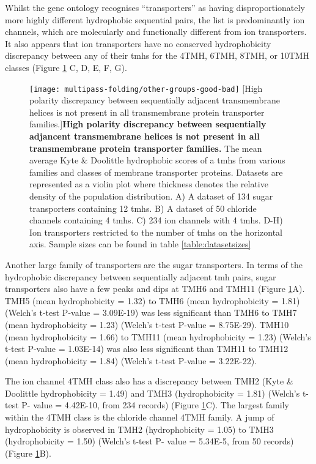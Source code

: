 Whilst the gene ontology recognises ``transporters'' as having disproportionately more highly different hydrophobic sequential pairs, the list is predominantly ion channels, which are molecularly and functionally different from ion transporters.
It also appears that ion transporters have no conserved hydrophobicity discrepancy between any of their \gls{tmh}s for the 4TMH, 6TMH, 8TMH, or 10TMH classes (Figure \ref{fig:other-groups-good-bad} C, D, E, F, G).

\begin{figure}[!ht]
\centering
\texttt{[image: multipass-folding/other-groups-good-bad]}
		[High polarity discrepancy between sequentially adjacent transmembrane helices is not present in all transmembrane protein transporter families.]{\textbf{High polarity discrepancy between sequentially adjancent transmembrane helices is not present in all transmembrane protein transporter families.}
    The mean average Kyte \& Doolittle hydrophobic scores of a \gls{tmh}s from various families and classes of membrane transporter proteins.
    Datasets are represented as a violin plot where thickness denotes the relative density of the population distribution.
    A) A dataset of  134 sugar transporters containing 12 \gls{tmh}s.
    B) A dataset of 50 chloride channels containing 4 \gls{tmh}s.
    C) 234 ion channels with 4 \gls{tmh}s.
    D-H) Ion transporters restricted to the number of \gls{tmh}s on the horizontal axis.
    Sample sizes can be found in table \ref{table:datasetsizes}}

\label{fig:other-groups-good-bad}
\end{figure}

Another large family of transporters are the sugar transporters.
In terms of the hydrophobic discrepancy between sequentially adjacent \gls{tmh} pairs, sugar transporters also have a few peaks and dips at TMH6 and TMH11 (Figure \ref{fig:other-groups-good-bad}A).
TMH5 (mean hydrophobicity = 1.32) to TMH6 (mean hydrophobicity = 1.81) (Welch's t\--test P\--value = 3.09E-19) was less significant than TMH6 to TMH7 (mean hydrophobicity = 1.23) (Welch's t\--test P\--value = 8.75E-29).
TMH10 (mean hydrophobicity = 1.66) to TMH11 (mean hydrophobicity = 1.23) (Welch's t\--test P\--value = 1.03E-14) was also less significant than TMH11 to TMH12 (mean hydrophobicity = 1.84) (Welch's t\--test P\--value = 3.22E-22).

The ion channel 4TMH class also has a discrepancy between TMH2 (Kyte \& Doolittle hydrophobicity = 1.49) and TMH3 (hydrophobicity = 1.81) (Welch's t\--test P\-- value = 4.42E-10, from 234 records) (Figure \ref{fig:other-groups-good-bad}C).
The largest family within the 4TMH class is the chloride channel 4TMH family.
A jump of hydrophobicity is observed in TMH2 (hydrophobicity = 1.05) to TMH3 (hydrophobicity = 1.50) (Welch's t\--test P\-- value = 5.34E-5, from 50 records) (Figure \ref{fig:other-groups-good-bad}B).

